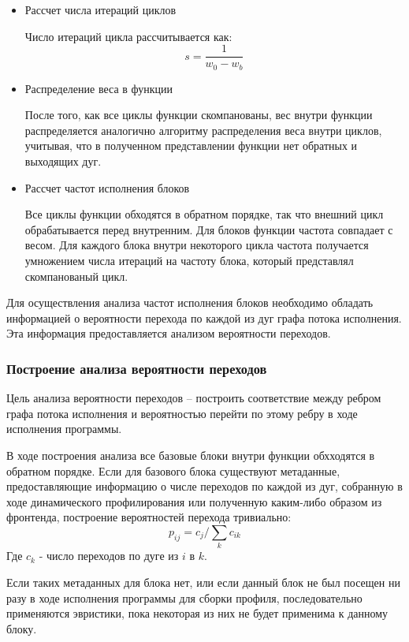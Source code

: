 \begin{itemize}
    \item{Рассчет числа итераций циклов}

        Число итераций цикла рассчитывается как:
        $$ s = \frac{1}{w_0 - w_b} $$

    \item{Распределение веса в функции}

        После того, как все циклы функции скомпанованы, вес внутри функции распределяется аналогично алгоритму распределения веса внутри циклов, учитывая, что в полученном представлении функции нет обратных и выходящих дуг.

    \item{Рассчет частот исполнения блоков}

        Все циклы функции обходятся в обратном порядке, так что внешний цикл обрабатывается перед внутренним.
        Для блоков функции частота совпадает с весом.
        Для каждого блока внутри некоторого цикла частота получается умножением числа итераций на частоту блока, который представлял скомпанованый цикл.

\end{itemize}

Для осуществления анализа частот исполнения блоков необходимо обладать информацией о вероятности перехода по каждой из дуг графа потока исполнения.
Эта информация предоставляется анализом вероятности переходов.

\subsubsection{Построение анализа вероятности переходов}

Цель анализа вероятности переходов -- построить соответствие между ребром графа потока исполнения и вероятностью перейти по этому ребру в ходе исполнения программы.

В ходе построения  анализа все базовые блоки внутри функции обхходятся в обратном порядке.
Если для базового блока существуют метаданные, предоставляющие информацию о числе переходов по каждой из дуг, собранную в ходе динамического профилирования или полученную каким-либо образом из фронтенда, построение вероятностей перехода тривиально:
$$ p_{ij} = c_{j} / \sum_k{c_{ik}} $$
Где $c_k$ - число переходов по дуге из $i$ в $k$.

Если таких метаданных для блока нет, или если данный блок не был посещен ни разу в ходе исполнения программы для сборки профиля, последовательно применяются эвристики, пока некоторая из них не будет применима к данному блоку.

